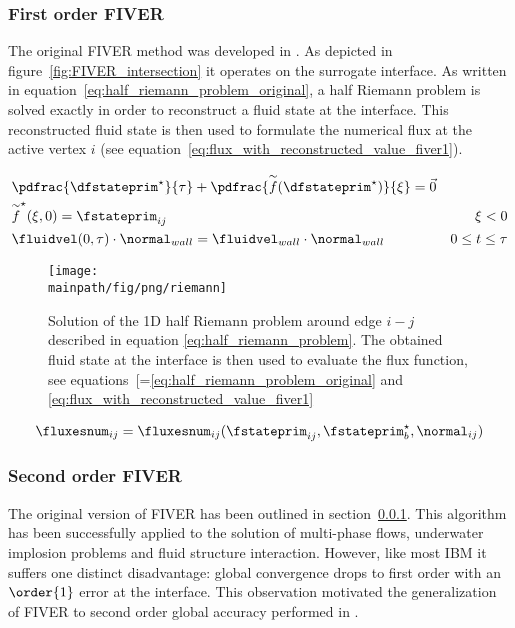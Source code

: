\documentclass[../main.tex]{subfiles}
\begin{document}
\subsubsection{First order \ac{FIVER}}\label{sec:fiver-1}
The original \ac{FIVER} method was developed in \cite{Farhat2008}. As depicted in figure~\ref{fig:FIVER_intersection} it operates on the surrogate interface. As written in equation~\eqref{eq:half_riemann_problem_original}, a half Riemann problem is solved exactly in order to reconstruct a fluid state at the interface. This reconstructed fluid state is then used to formulate the numerical flux at the active vertex $i$ (see equation~\eqref{eq:flux_with_reconstructed_value_fiver1}).


\begin{align}\label{eq:half_riemann_problem_original}
&\pdfrac{\dfstateprim^{\star}}{\tau} + \pdfrac{\overset{\sim}{f}(\dfstateprim^{\star})}{\xi} = \vec{0} & \nonumber\\
&\overset{\sim}{f}^{\star}(\xi,0)=\fstateprim_{ij}                                                     & \xi<0 \nonumber\\
&\fluidvel(0,\tau)\cdot \normal_{wall} = \fluidvel_{wall}\cdot\normal_{wall}                          & 0\leq t \leq \tau
\end{align}

\begin{figure}[h!]
	\begin{center}
        \texttt{[image: \\mainpath/fig/png/riemann]}
        \caption[Riemann Sketch]{Solution of the 1D half Riemann problem around edge $i-j$ described in equation \eqref{eq:half_riemann_problem}. The obtained fluid state at the interface is then used to evaluate the flux function, see equations~[=\eqref{eq:half_riemann_problem_original} and \eqref{eq:flux_with_reconstructed_value_fiver1}}
		\label{fig:riemann_sketch}
    \end{center}
\end{figure}

\begin{align}\label{eq:flux_with_reconstructed_value_fiver1}
\fluxesnum_{ij}=\fluxesnum_{ij}(\fstateprim_{ij},\fstateprim^{\star}_b, \normal_{ij})
\end{align}



\subsubsection{Second order \ac{FIVER}}\label{sec:fiver-2}
The original version of \ac{FIVER} has been outlined in section~\ref{sec:fiver-1}. This algorithm has been successfully applied to the solution of multi-phase flows, underwater implosion problems and fluid structure interaction. However, like most \ac{IBM} it suffers one distinct disadvantage: global convergence drops to first order with an $\order{1}$ error at the interface. This observation motivated the generalization of FIVER to second order global accuracy performed in \cite{Main2014}.\\
\end{document}
